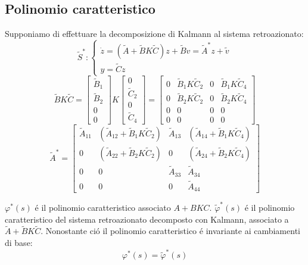 \documentclass[../main.tex]{subfiles}
\begin{document}
	\subsection{Polinomio caratteristico}
		Supponiamo di effettuare la decomposizione di Kalmann al sistema retroazionato:
		\[
			\tilde S^{*}:
			\begin{cases}
				\dot z = (\tilde A + \tilde B K \tilde C)z + \tilde B v = \tilde A^{*} z + \tilde v
				\\
				y = \tilde C z
			\end{cases}
		\]
		\[
			\tilde B K \tilde C =
			\begin{bmatrix}
				\tilde B_1\\
				\tilde B_2\\
				0\\
				0
			\end{bmatrix} K
			\begin{bmatrix}
				0\\
				\tilde C_2\\
				0\\
				\tilde C_4
			\end{bmatrix} =
			\begin{bmatrix}
				0 & \tilde B_1 K \tilde C_2 & 0 & \tilde B_1 K \tilde C_4\\
				0 & \tilde B_2 K \tilde C_2 & 0 & \tilde B_2 K \tilde C_4\\
				0 & 0 & 0 & 0\\
				0 & 0 & 0 & 0
			\end{bmatrix}
		\]
		\[
			\tilde A^{*} =
			\begin{bmatrix}
				\tilde A_{11} & (\tilde A_{12} + \tilde B_1 K \tilde C_2) & \tilde A_{13} & (\tilde A_{14} + \tilde B_1 K \tilde C_4)\\
				0 & (\tilde A_{22} + \tilde B_2 K \tilde C_2) & 0 & (\tilde A_{24} + \tilde B_2 K \tilde C_4)\\
				0 & 0 & \tilde A_{33} & \tilde A_{34}\\
				0 & 0 & 0 & \tilde A_{44}
			\end{bmatrix}
		\]
		
		$ \varphi^{*}(s) $ \'e il polinomio caratteristico associato $ A + BKC $. $ \tilde \varphi^{*}(s) $ \'e il polinomio caratteristico del sistema retroazionato decomposto con Kalmann, associato a $ \tilde A + \tilde B K \tilde C $. Nonostante ci\'o il polinomio caratteristico \'e invariante ai cambiamenti di base:
		\[
			\varphi^{*}(s) = \tilde \varphi^{*}(s)
		\]
		
\end{document}
